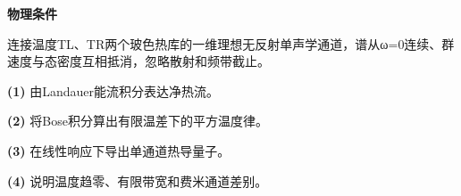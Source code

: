 \textbf{物理条件}\par 连接温度TL、TR两个玻色热库的一维理想无反射单声学通道，谱从ω=0连续、群速度与态密度互相抵消，忽略散射和频带截止。
\par\noindent\textbf{(1)} 由Landauer能流积分表达净热流。
\par\noindent\textbf{(2)} 将Bose积分算出有限温差下的平方温度律。
\par\noindent\textbf{(3)} 在线性响应下导出单通道热导量子。
\par\noindent\textbf{(4)} 说明温度趋零、有限带宽和费米通道差别。
